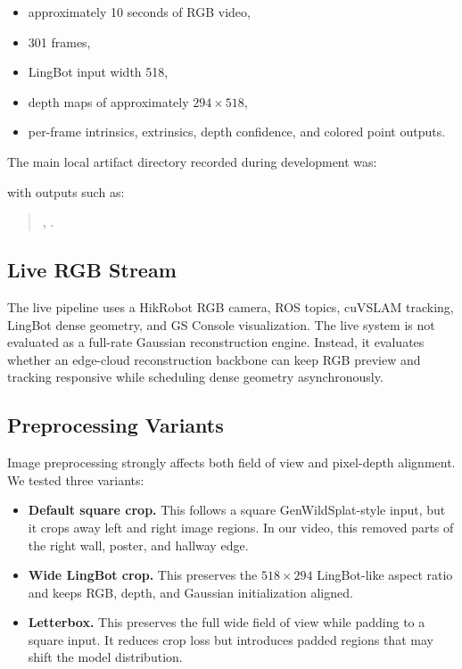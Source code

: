 \documentclass[11pt]{article}
\begin{document}
\begin{itemize}
    \item approximately 10 seconds of RGB video,
    \item 301 frames,
    \item LingBot input width 518,
    \item depth maps of approximately \(294 \times 518\),
    \item per-frame intrinsics, extrinsics, depth confidence, and colored point outputs.
\end{itemize}

The main local artifact directory recorded during development was:

\begin{quote}
\end{quote}

with outputs such as:

\begin{quote}
, .
\end{quote}

\subsection{Live RGB Stream}

The live pipeline uses a HikRobot RGB camera, ROS topics, cuVSLAM tracking, LingBot dense geometry, and GS Console visualization. The live system is not evaluated as a full-rate Gaussian reconstruction engine. Instead, it evaluates whether an edge-cloud reconstruction backbone can keep RGB preview and tracking responsive while scheduling dense geometry asynchronously.

\subsection{Preprocessing Variants}

Image preprocessing strongly affects both field of view and pixel-depth alignment. We tested three variants:

\begin{itemize}
    \item \textbf{Default square crop.} This follows a square GenWildSplat-style input, but it crops away left and right image regions. In our video, this removed parts of the right wall, poster, and hallway edge.
    \item \textbf{Wide LingBot crop.} This preserves the \(518 \times 294\) LingBot-like aspect ratio and keeps RGB, depth, and Gaussian initialization aligned.
    \item \textbf{Letterbox.} This preserves the full wide field of view while padding to a square input. It reduces crop loss but introduces padded regions that may shift the model distribution.
\end{itemize}
\end{document}
